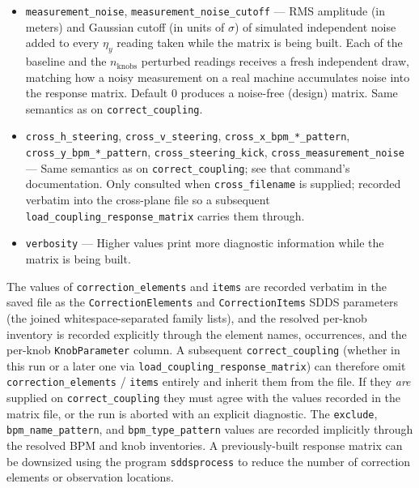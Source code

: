 \documentclass[11pt]{article}
\begin{document}
\begin{itemize}
  used to build each column of $R$ (one-sided difference).  Must be small
  enough to be in the linear regime of the dependence of $\eta_y$ on the
  knob, but large enough to avoid numerical noise.
\item \verb|measurement_noise|, \verb|measurement_noise_cutoff| --- RMS
  amplitude (in meters) and Gaussian cutoff (in units of $\sigma$) of
  simulated independent noise added to every $\eta_y$ reading taken
  while the matrix is being built.  Each of the baseline and the
  $n_{\mathrm{knobs}}$ perturbed readings receives a fresh independent draw,
  matching how a noisy measurement on a real machine accumulates noise
  into the response matrix.  Default 0 produces a noise-free (design) matrix.
  Same semantics as on \verb|correct_coupling|.
\item \verb|cross_h_steering|, \verb|cross_v_steering|,
  \verb|cross_x_bpm_*_pattern|, \verb|cross_y_bpm_*_pattern|,
  \verb|cross_steering_kick|, \verb|cross_measurement_noise| --- Same
  semantics as on \verb|correct_coupling|; see that command's documentation.
  Only consulted when \verb|cross_filename| is supplied; recorded verbatim
  into the cross-plane file so a subsequent \verb|load_coupling_response_matrix|
  carries them through.
\item \verb|verbosity| --- Higher values print more diagnostic information
  while the matrix is being built.
\end{itemize}

The values of \verb|correction_elements| and \verb|items| are recorded
verbatim in the saved file as the \verb|CorrectionElements| and
\verb|CorrectionItems| SDDS parameters (the joined whitespace-separated
family lists), and the resolved per-knob inventory is recorded
explicitly through the element names, occurrences, and the per-knob
\verb|KnobParameter| column.  A subsequent \verb|correct_coupling|
(whether in this run or a later one via \verb|load_coupling_response_matrix|)
can therefore omit \verb|correction_elements| / \verb|items| entirely
and inherit them from the file.  If they {\em are} supplied on
\verb|correct_coupling| they must agree with the values recorded in the
matrix file, or the run is aborted with an explicit diagnostic.  The
\verb|exclude|, \verb|bpm_name_pattern|, and \verb|bpm_type_pattern|
values are recorded implicitly through the resolved BPM and knob
inventories.
A previously-built response matrix can be downsized using the program
\verb|sddsprocess| to reduce the number of correction elements or
observation locations.
\end{document}
